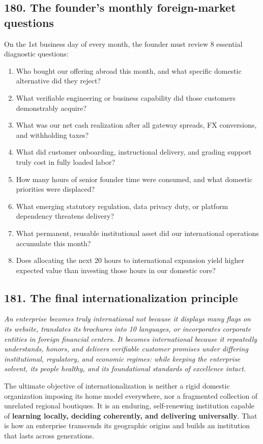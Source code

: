 \subsection{180. The founder's monthly foreign-market questions}

On the 1st business day of every month, the founder must review 8 essential diagnostic questions:
\begin{enumerate}
    \item Who bought our offering abroad this month, and what specific domestic alternative did they reject?
    \item What verifiable engineering or business capability did those customers demonstrably acquire?
    \item What was our net cash realization after all gateway spreads, FX conversions, and withholding taxes?
    \item What did customer onboarding, instructional delivery, and grading support truly cost in fully loaded labor?
    \item How many hours of senior founder time were consumed, and what domestic priorities were displaced?
    \item What emerging statutory regulation, data privacy duty, or platform dependency threatens delivery?
    \item What permanent, reusable institutional asset did our international operations accumulate this month?
    \item Does allocating the next 20 hours to international expansion yield higher expected value than investing those hours in our domestic core?
\end{enumerate}

\subsection{181. The final internationalization principle}

\begin{tcolorbox}[colback=BayesCanvas,colframe=BayesTeal,arc=1mm,title=\textbf{The Sovereign Principle of International Expansion}]
\itshape
An enterprise becomes truly international not because it displays many flags on its website, translates its brochures into 10 languages, or incorporates corporate entities in foreign financial centers. It becomes international because it repeatedly understands, honors, and delivers verifiable customer promises under differing institutional, regulatory, and economic regimes: while keeping the enterprise solvent, its people healthy, and its foundational standards of excellence intact.

The ultimate objective of internationalization is neither a rigid domestic organization imposing its home model everywhere, nor a fragmented collection of unrelated regional boutiques. It is an enduring, self-renewing institution capable of \textbf{learning locally, deciding coherently, and delivering universally}. That is how an enterprise transcends its geographic origins and builds an institution that lasts across generations.
\end{tcolorbox}
